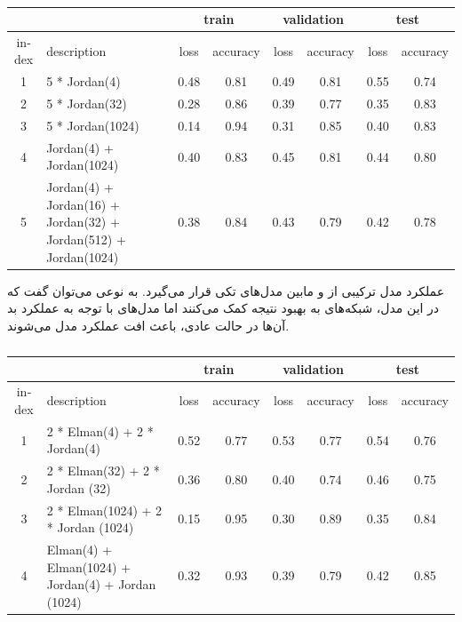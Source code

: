 \documentclass[12pt, a4paper]{article}
\begin{document}
\begin{latin}
\begin{table}[h]
    \centering
    \caption{}
    \label{pure_jordan_performance_common_dataset}
    \begin{tabular}{c|p{3cm}|c|c|c|c|c|c}
        & & \multicolumn{2}{c|}{\cellcolor{teal!30}train} & \multicolumn{2}{c|}{\cellcolor{teal!30}validation} &  \multicolumn{2}{c}{\cellcolor{teal!30}test} \\ \hline
        index & description & loss & accuracy & loss & accuracy & loss & accuracy\\ \hline
        1 & 5 * Jordan(4) & 0.48 & 0.81 & 0.49 & 0.81 & 0.55 & 0.74 \\ \hline
        2 & 5 * Jordan(32) & 0.28 & 0.86 & 0.39 & 0.77 & 0.35 & 0.83 \\ \hline
        3 & 5 * Jordan(1024) & 0.14 & 0.94 & 0.31 & 0.85 & 0.40 & 0.83 \\ \hline
        4 & Jordan(4) + Jordan(1024) & 0.40 & 0.83 & 0.45 & 0.81 & 0.44 & 0.80 \\ \hline
        5 & Jordan(4) + Jordan(16) + Jordan(32) + Jordan(512) + Jordan(1024) & 0.38 & 0.84 & 0.43 & 0.79 & 0.42 & 0.78 \\ \hline
     \end{tabular}
\end{table}
\end{latin}

عملکرد مدل ترکیبی از  و  مابین مدل‌های تکی قرار می‌گیرد.
به نوعی می‌توان گفت که در این مدل، شبکه‌های  به بهبود نتیجه کمک می‌کنند
اما مدل‌های  با توجه به عملکرد بد آن‌ها در حالت عادی، باعث افت عملکرد مدل می‌شوند.

\begin{latin}
\begin{table}[h]
    \centering
    \caption{}
    \label{elman_jordan_performance_common_dataset}
    \begin{tabular}{c|p{3cm}|c|c|c|c|c|c}
        & & \multicolumn{2}{c|}{\cellcolor{teal!30}train} & \multicolumn{2}{c|}{\cellcolor{teal!30}validation} &  \multicolumn{2}{c}{\cellcolor{teal!30}test} \\ \hline
        index & description & loss & accuracy & loss & accuracy & loss & accuracy\\ \hline
        1 & 2 * Elman(4) + 2 * Jordan(4) & 0.52 & 0.77 & 0.53 & 0.77 & 0.54 & 0.76 \\ \hline
        2 & 2 * Elman(32) + 2 * Jordan (32) & 0.36 & 0.80 & 0.40 & 0.74 & 0.46 & 0.75 \\ \hline
        3 & 2 * Elman(1024) + 2 * Jordan (1024) & 0.15 & 0.95 & 0.30 & 0.89 & 0.35 & 0.84 \\ \hline
        4 & Elman(4) + Elman(1024) + Jordan(4) + Jordan (1024) & 0.32 & 0.93 & 0.39 & 0.79 & 0.42 & 0.85
    \end{tabular}
\end{table}
\end{latin}
\end{document}
